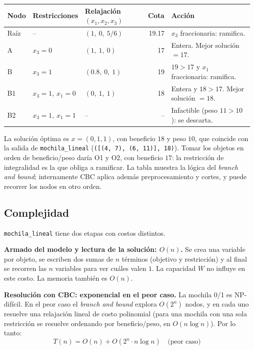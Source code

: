 \documentclass[11pt,a4paper]{article}
\begin{document}
\begin{table}[h!]
    \centering
    \begin{tabular}{@{}lp{3cm}lrp{4.5cm}@{}}
        \toprule
        \textbf{Nodo} & \textbf{Restricciones} & \textbf{Relajación $(x_1,x_2,x_3)$} & \textbf{Cota} & \textbf{Acción} \\ \midrule
        Raíz & -- & $(1,\ 0,\ 5/6)$ & 19.17 & $x_3$ fraccionaria: ramifica. \\
        A & $x_3 = 0$ & $(1,\ 1,\ 0)$ & 17 & Entera. Mejor solución $= 17$. \\
        B & $x_3 = 1$ & $(0.8,\ 0,\ 1)$ & 19 & $19 > 17$ y $x_1$ fraccionaria: ramifica. \\
        B1 & $x_3 = 1,\ x_1 = 0$ & $(0,\ 1,\ 1)$ & 18 & Entera y $18 > 17$. Mejor solución $= 18$. \\
        B2 & $x_3 = 1,\ x_1 = 1$ & -- & -- & Infactible (peso $11 > 10$): se descarta. \\ \bottomrule
    \end{tabular}
\end{table}

La solución óptima es $x = (0, 1, 1)$, con beneficio $18$ y peso $10$, que coincide con la salida de \texttt{mochila\_lineal} (\texttt{([(4, 7), (6, 11)], 18)}). Tomar los objetos en orden de beneficio/peso daría O1 y O2, con beneficio $17$: la restricción de integralidad es la que obliga a ramificar. La tabla muestra la lógica del \textit{branch and bound}; internamente CBC aplica además preprocesamiento y cortes, y puede recorrer los nodos en otro orden.

\subsection{Complejidad}
\texttt{mochila\_lineal} tiene dos etapas con costos distintos.

\textbf{Armado del modelo y lectura de la solución: $O(n)$.} Se crea una variable por objeto, se escriben dos sumas de $n$ términos (objetivo y restricción) y al final se recorren las $n$ variables para ver cuáles valen $1$. La capacidad $W$ no influye en este costo. La memoria también es $O(n)$.

\textbf{Resolución con CBC: exponencial en el peor caso.} La mochila 0/1 es NP-difícil. En el peor caso el \textit{branch and bound} explora $O(2^n)$ nodos, y en cada uno resuelve una relajación lineal de costo polinomial (para una mochila con una sola restricción se resuelve ordenando por beneficio/peso, en $O(n \log n)$). Por lo tanto:
\[
    T(n) = O(n) + O(2^n \cdot n \log n) \quad \text{(peor caso)}
\]
\end{document}

